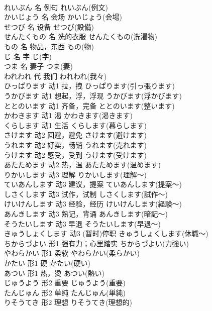 \documentclass[8pt]{extreport}
\begin{document}
\begin{CJK}{UTF8}{min}
\\	れいぶん	名	例句	れいぶん(例文)	
\\	かいじょう	名	会场	かいじょう(会場)	
\\	せつび	名	设备	せつび(設備)	
\\	せんたくもの	名	洗的衣服	せんたくもの(洗濯物)	
\\	もの	名	物品，东西	もの(物)	
\\	じ	名	字	じ(字)	
\\	つま	名	妻子	つま(妻)	
\\	われわれ	代	我们	われわれ(我々)	
\\	ひっぱります	动1	拉，拽	ひっぱります(引っ張ります)	
\\	うかびます	动1	想起，浮，浮现	うかびます(浮かびます)	
\\	ととのいます	动1	齐备，完备	ととのいます(整います)	
\\	かわきます	动1	渴	かわきます(渇きます)	
\\	くらします	动1	生活	くらします(暮らします)	
\\	さけます	动2	回避，避免	さけます(避けます)	
\\	うれます	动2	好卖，畅销	うれます(売れます)	
\\	うけます	动2	感受，受到	うけます(受けます)	
\\	あたためます	动2	热，温	あたためます(温めます)	
\\	りかいします	动3	理解	りかいします(理解～)	
\\	ていあんします	动3	建议，提案	ていあんします(提案～)	
\\	しさくします	动3	试作，试制	しさくします(試作～)	
\\	けいけんします	动3	经验，经历	けいけんします(経験～)	
\\	あんきします	动3	熟记，背诵	あんきします(暗記～)	
\\	そうたいします	动3	早退	そうたいします(早退～)	
\\	きゅうしょくします	动3	(暂时)停职	きゅうしょくします(休職～)	
\\	ちからづよい	形1	强有力；心里踏实	ちからづよい(力強い)	
\\	やわらかい	形1	柔软	やわらかい(柔らかい)	
\\	かたい	形1	硬	かたい(硬い)	
\\	あつい	形1	热，烫	あつい(熱い)	
\\	じゅうよう	形2	重要	じゅうよう(重要)	
\\	たんじゅん	形2	单纯	たんじゅん(単純)	
\\	りそうてき	形2	理想	りそうてき(理想的)	

\end{CJK}
\end{document}
